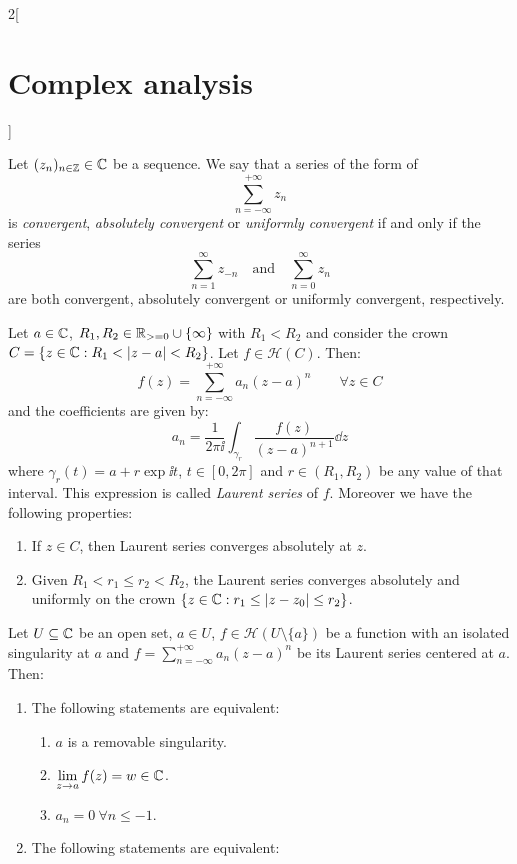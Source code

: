 \documentclass[../../../main_math.tex]{subfiles}
\begin{document}
\begin{multicols}{2}[\section{Complex analysis}]
\begin{definition}
  \end{definition}
  \begin{definition}
    Let $(z_n)_{n\in\mathbb{Z}}\in\mathbb{C}$ be a sequence. We say that a series of the form of $$\sum_{n=-\infty}^{+\infty} z_n$$ is \emph{convergent}, \emph{absolutely convergent} or \emph{uniformly convergent} if and only if the series $$\sum_{n=1}^{\infty}z_{-n}\quad\text{and}\quad\sum_{n=0}^\infty z_n$$ are both convergent, absolutely convergent or uniformly convergent, respectively.
  \end{definition}
  \begin{theorem}
    Let $a\in\mathbb{C}$, $R_1,R_2\in\mathbb{R}_{>=0}\cup\{\infty\}$ with $R_1<R_2$ and consider the crown $C=\{z\in\mathbb{C}:R_1<\abs{z-a}<R_2\}$. Let $f\in\mathcal{H}(C)$. Then: $$f(z)=\sum_{n=-\infty}^{+\infty} a_n{(z-a)}^n\qquad\forall z\in C$$ and the coefficients are given by: $$a_n=\frac{1}{2\pi\ii}\int_{\gamma_r}\frac{f(z)}{{(z-a)}^{n+1}}\dd{z}$$ where $\gamma_r(t)=a+r\exp{\ii t}$, $t\in[0,2\pi]$ and $r\in(R_1,R_2)$ be any value of that interval. This expression is called \emph{Laurent series} of $f$. Moreover we have the following properties:
    \begin{enumerate}
      \item If $z\in C$, then Laurent series converges absolutely at $z$.
      \item Given $R_1<r_1\leq r_2<R_2$, the Laurent series converges absolutely and uniformly on the crown $\{z\in\mathbb{C}:r_1\leq\abs{z-z_0}\leq r_2\}$.
    \end{enumerate}
  \end{theorem}
  \begin{corollary}
    Let $U\subseteq \mathbb{C}$ be an open set, $a\in U$, $f\in\mathcal{H}(U\setminus\{a\})$ be a function with an isolated singularity at $a$ and $f=\sum_{n=-\infty}^{+\infty} a_n{(z-a)}^n$ be its Laurent series centered at $a$. Then:
    \begin{enumerate}
      \item The following statements are equivalent:
            \begin{enumerate}
              \item $a$ is a removable singularity.
              \item $\displaystyle\lim_{z\to a} f(z)= w\in\mathbb{C}$.
              \item $a_n=0\ \forall n\leq -1$.
            \end{enumerate}
      \item  The following statements are equivalent:

\end{enumerate}
\end{corollary}
\end{multicols}
\end{document}
